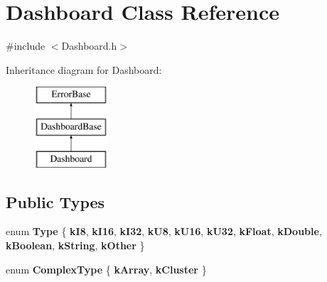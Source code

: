 \hypertarget{classDashboard}{\section{\-Dashboard \-Class \-Reference}
\label{classDashboard}
}


{\ttfamily \#include $<$\-Dashboard.\-h$>$}

\-Inheritance diagram for \-Dashboard\-:\begin{figure}[H]
\begin{center}
\leavevmode
\includegraphics[height=3.000000cm]{classDashboard}
\end{center}
\end{figure}
\subsection*{\-Public \-Types}
\begin{DoxyCompactItemize}
\item 
enum {\bfseries \-Type} \{ \*
{\bfseries k\-I8}, 
{\bfseries k\-I16}, 
{\bfseries k\-I32}, 
{\bfseries k\-U8}, 
\*
{\bfseries k\-U16}, 
{\bfseries k\-U32}, 
{\bfseries k\-Float}, 
{\bfseries k\-Double}, 
\*
{\bfseries k\-Boolean}, 
{\bfseries k\-String}, 
{\bfseries k\-Other}
 \}
\item 
enum {\bfseries \-Complex\-Type} \{ {\bfseries k\-Array}, 
{\bfseries k\-Cluster}
 \}
\end{DoxyCompactItemize}
